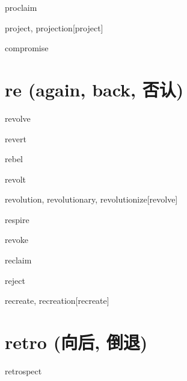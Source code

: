\begin{RefWord}{proclaim}
\end{RefWord}

\begin{RefWord}{project, projection}[project]
\end{RefWord}

\begin{RefWord}{compromise}
\end{RefWord}

\section{re (again, back, 否认)}

\begin{RefWord}{revolve}
\end{RefWord}

\begin{RefWord}{revert}
\end{RefWord}

\begin{RefWord}{rebel}
\end{RefWord}

\begin{RefWord}{revolt}
\end{RefWord}

\begin{RefWord}{revolution, revolutionary, revolutionize}[revolve]
\end{RefWord}

\begin{RefWord}{respire}
\end{RefWord}

\begin{RefWord}{revoke}
\end{RefWord}

\begin{RefWord}{reclaim}
\end{RefWord}

\begin{RefWord}{reject}
\end{RefWord}

\begin{RefWord}{recreate, recreation}[recreate]
\end{RefWord}

\section{retro (向后, 倒退)}
\begin{RefWord}{retrospect}
\end{RefWord}


